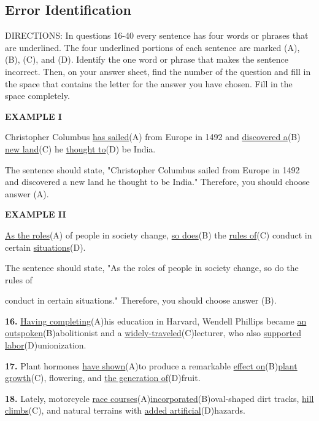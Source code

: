 \documentclass[12pt]{article}
\begin{document}
\subsection*{Error Identification}
DIRECTIONS: In questions 16-40 every sentence has four words or phrases that are underlined. The four underlined portions of each sentence are marked (A), (B), (C), and (D). Identify the one word or phrase that makes the sentence incorrect. Then, on your answer sheet, find the number of the question and fill in the space that contains the letter for the answer you have chosen. Fill in the space completely.\par
\begin{exampleblock}
\textbf{EXAMPLE I}\par
Christopher Columbus \uline{has sailed}(A) from Europe in 1492 and \uline{discovered a}(B) \uline{new land}(C) he \uline{thought to}(D) be India.\par
The sentence should state, "Christopher Columbus sailed from Europe in 1492 and discovered a new land he thought to be India." Therefore, you should choose answer (A).\par
\end{exampleblock}
\begin{exampleblock}
\textbf{EXAMPLE II}\par
\uline{As the roles}(A) of people in society change, \uline{so does}(B) the \uline{rules of}(C) conduct in certain \uline{situations}(D).\par
The sentence should state, "As the roles of people in society change, so do the rules of\par
conduct in certain situations." Therefore, you should choose answer (B).\par
\end{exampleblock}
\noindent\textbf{16.} \uline{Having completing}(A)his education in Harvard, Wendell Phillips became \uline{an outspoken}(B)abolitionist and a \uline{widely-traveled}(C)lecturer, who also \uline{supported labor}(D)unionization.
\par
\vspace{\questionblockgap}
\noindent\textbf{17.} Plant hormones \uline{have shown}(A)to produce a remarkable \uline{effect on}(B)\uline{plant growth}(C), flowering, and \uline{the generation of}(D)fruit.
\par
\vspace{\questionblockgap}
\noindent\textbf{18.} Lately, motorcycle \uline{race courses}(A)\uline{incorporated}(B)oval-shaped dirt tracks, \uline{hill climbs}(C), and natural terrains with \uline{added artificial}(D)hazards.
\end{document}
